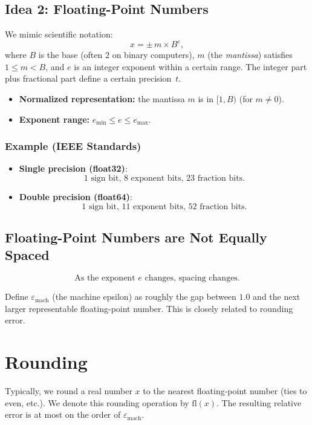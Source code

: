 \documentclass[12pt]{article}
\begin{document}
\subsection*{Idea 2: Floating-Point Numbers}
We mimic scientific notation:
\[
x = \pm\, m \times B^e,
\]
where $B$ is the base (often $2$ on binary computers), $m$ (the \emph{mantissa}) satisfies $1 \le m < B$, and $e$ is an integer exponent within a certain range. The integer part plus fractional part define a certain precision~$t$.

\begin{itemize}
    \item \textbf{Normalized representation:} the mantissa $m$ is in $[1,B)$ (for $m \neq 0$).
    \item \textbf{Exponent range:} $e_{\min} \le e \le e_{\max}$.
\end{itemize}

\subsubsection*{Example (IEEE Standards)}
\begin{itemize}
    \item \textbf{Single precision (float32)}: 
    \[
      1 \text{ sign bit},\, 8 \text{ exponent bits},\, 23 \text{ fraction bits}.
    \]
    \item \textbf{Double precision (float64)}:
    \[
      1 \text{ sign bit},\, 11 \text{ exponent bits},\, 52 \text{ fraction bits}.
    \]
\end{itemize}

\subsection*{Floating-Point Numbers are Not Equally Spaced}
\[
\text{As the exponent } e \text{ changes, spacing changes.}
\]

Define $\varepsilon_{\text{mach}}$ (the machine epsilon) as roughly the gap between $1.0$ and the next larger representable floating-point number. This is closely related to rounding error.

\section*{Rounding}
Typically, we round a real number $x$ to the nearest floating-point number (ties to even, etc.). We denote this rounding operation by \(\mathrm{fl}(x)\). The resulting relative error is at most on the order of $\varepsilon_{\text{mach}}$.
\end{document}
